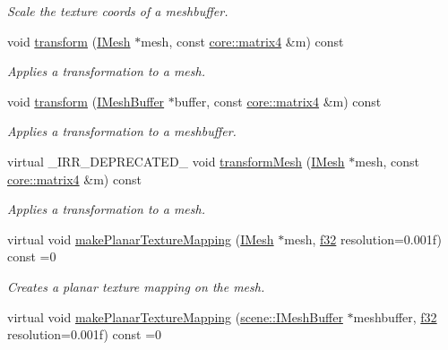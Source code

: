 \begin{DoxyCompactItemize}
\begin{DoxyCompactList}\small\item\em Scale the texture coords of a meshbuffer. \end{DoxyCompactList}\item 
void \hyperlink{classirr_1_1scene_1_1IMeshManipulator_a9f9962d31cbd4ebeb1be0812765884cf}{transform} (\hyperlink{classirr_1_1scene_1_1IMesh}{I\+Mesh} $\ast$mesh, const \hyperlink{namespaceirr_1_1core_a4c9d4e29899535971052810954a14431}{core\+::matrix4} \&m) const
\begin{DoxyCompactList}\small\item\em Applies a transformation to a mesh. \end{DoxyCompactList}\item 
void \hyperlink{classirr_1_1scene_1_1IMeshManipulator_a14dc2101f7facaddec49f59ed363bbc1}{transform} (\hyperlink{classirr_1_1scene_1_1IMeshBuffer}{I\+Mesh\+Buffer} $\ast$buffer, const \hyperlink{namespaceirr_1_1core_a4c9d4e29899535971052810954a14431}{core\+::matrix4} \&m) const
\begin{DoxyCompactList}\small\item\em Applies a transformation to a meshbuffer. \end{DoxyCompactList}\item 
virtual \+\_\+\+I\+R\+R\+\_\+\+D\+E\+P\+R\+E\+C\+A\+T\+E\+D\+\_\+ void \hyperlink{classirr_1_1scene_1_1IMeshManipulator_a10e09e28622a5d1f5fd0f3a65fd2cb5b}{transform\+Mesh} (\hyperlink{classirr_1_1scene_1_1IMesh}{I\+Mesh} $\ast$mesh, const \hyperlink{namespaceirr_1_1core_a4c9d4e29899535971052810954a14431}{core\+::matrix4} \&m) const
\begin{DoxyCompactList}\small\item\em Applies a transformation to a mesh. \end{DoxyCompactList}\item 
virtual void \hyperlink{classirr_1_1scene_1_1IMeshManipulator_a82a3092d53e84e751bb13dac8dfa2ab4}{make\+Planar\+Texture\+Mapping} (\hyperlink{classirr_1_1scene_1_1IMesh}{I\+Mesh} $\ast$mesh, \hyperlink{namespaceirr_a0277be98d67dc26ff93b1a6a1d086b07}{f32} resolution=0.\+001f) const =0
\begin{DoxyCompactList}\small\item\em Creates a planar texture mapping on the mesh. \end{DoxyCompactList}\item 
virtual void \hyperlink{classirr_1_1scene_1_1IMeshManipulator_a757511833420a24ed8cbf4dfd6607143}{make\+Planar\+Texture\+Mapping} (\hyperlink{classirr_1_1scene_1_1IMeshBuffer}{scene\+::\+I\+Mesh\+Buffer} $\ast$meshbuffer, \hyperlink{namespaceirr_a0277be98d67dc26ff93b1a6a1d086b07}{f32} resolution=0.\+001f) const =0

\end{DoxyCompactItemize}
